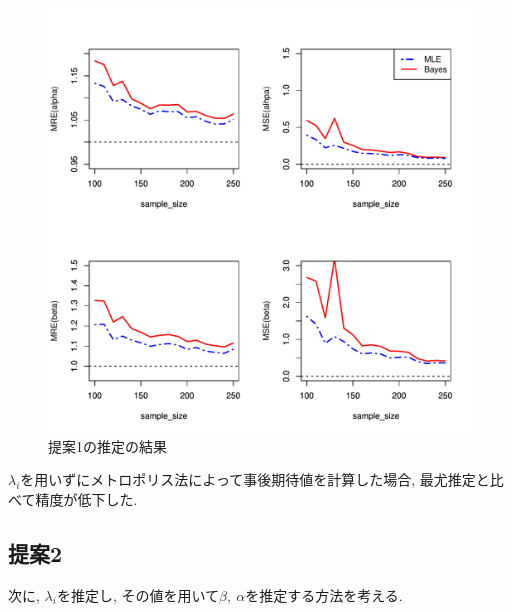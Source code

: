 \documentclass[titlepage,twoside]{jarticle}
\theoremstyle{definition}
\begin{document}
\begin{figure}[ht]
\begin{center}
\includegraphics[width=120mm]{notlambda}
\caption{提案1の推定の結果}
 \label{fig4}
 \end{center}
\end{figure}
$\lambda_i$を用いずにメトロポリス法によって事後期待値を計算した場合, 最尤推定と比べて精度が低下した.

\subsection{提案2}\label{suggestion2}

次に, $\lambda_i$を推定し, その値を用いて$\beta,~\alpha$を推定する方法を考える.
\end{document}
